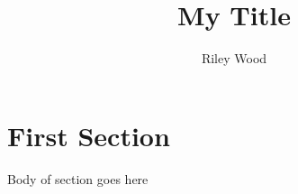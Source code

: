 \documentclass{article}
\title{My Title}
\author{Riley Wood}
\begin{document}
\maketitle


\section*{First Section}
Body of section goes here




\end{document}
